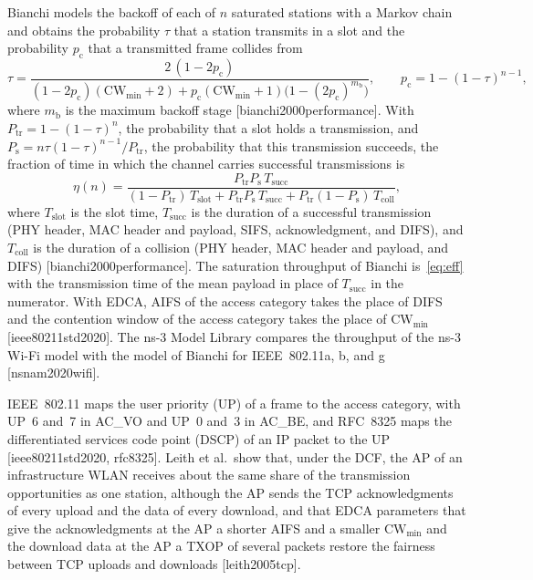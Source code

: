 
Bianchi models the backoff of each of $n$ saturated stations with a Markov chain and obtains the probability $\tau$ that a station transmits in a slot and the probability $p_{\mathrm{c}}$ that a transmitted frame collides from
\begin{equation}
\tau = \frac{2\,(1 - 2p_{\mathrm{c}})}{(1 - 2p_{\mathrm{c}})(\mathrm{CW}_{\min} + 2) + p_{\mathrm{c}} (\mathrm{CW}_{\min} + 1) \big(1 - (2p_{\mathrm{c}})^{m_{\mathrm{b}}}\big)}, \qquad p_{\mathrm{c}} = 1 - (1 - \tau)^{n-1},
\label{eq:bianchi}
\end{equation}
where $m_{\mathrm{b}}$ is the maximum backoff stage [bianchi2000performance]. With $P_{\mathrm{tr}} = 1 - (1 - \tau)^n$, the probability that a slot holds a transmission, and $P_{\mathrm{s}} = n\tau(1-\tau)^{n-1}/P_{\mathrm{tr}}$, the probability that this transmission succeeds, the fraction of time in which the channel carries successful transmissions is
\begin{equation}
\eta(n) = \frac{P_{\mathrm{tr}} P_{\mathrm{s}}\, T_{\mathrm{succ}}}{(1 - P_{\mathrm{tr}})\,T_{\mathrm{slot}} + P_{\mathrm{tr}} P_{\mathrm{s}}\, T_{\mathrm{succ}} + P_{\mathrm{tr}}(1 - P_{\mathrm{s}})\, T_{\mathrm{coll}}},
\label{eq:eff}
\end{equation}
where $T_{\mathrm{slot}}$ is the slot time, $T_{\mathrm{succ}}$ is the duration of a successful transmission (PHY header, MAC header and payload, SIFS, acknowledgment, and DIFS), and $T_{\mathrm{coll}}$ is the duration of a collision (PHY header, MAC header and payload, and DIFS) [bianchi2000performance]. The saturation throughput of Bianchi is~\eqref{eq:eff} with the transmission time of the mean payload in place of $T_{\mathrm{succ}}$ in the numerator. With EDCA, AIFS of the access category takes the place of DIFS and the contention window of the access category takes the place of $\mathrm{CW}_{\min}$ [ieee80211std2020]. The ns-3 Model Library compares the throughput of the ns-3 Wi-Fi model with the model of Bianchi for IEEE~802.11a, b, and g [nsnam2020wifi].

IEEE~802.11 maps the user priority (UP) of a frame to the access category, with UP~6 and~7 in AC\_VO and UP~0 and~3 in AC\_BE, and RFC~8325 maps the differentiated services code point (DSCP) of an IP packet to the UP [ieee80211std2020, rfc8325]. Leith et al.\ show that, under the DCF, the AP of an infrastructure WLAN receives about the same share of the transmission opportunities as one station, although the AP sends the TCP acknowledgments of every upload and the data of every download, and that EDCA parameters that give the acknowledgments at the AP a shorter AIFS and a smaller $\mathrm{CW}_{\min}$ and the download data at the AP a TXOP of several packets restore the fairness between TCP uploads and downloads [leith2005tcp].

